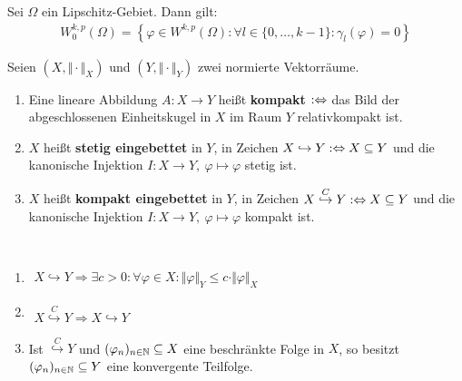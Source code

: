 \begin{satz}
	Sei $\Omega$ ein Lipschitz-Gebiet.
	Dann gilt:
	\begin{align*}
		W_0^{k,p}(\Omega)=\left\lbrace\varphi\in W^{k,p}(\Omega):
		\forall l\in\lbrace0,\ldots,k-1\rbrace:\gamma_l(\varphi)=0\right\rbrace
	\end{align*}
\end{satz}

\begin{definition}
	Seien $(X,\Vert\cdot\Vert_X)$ und $(Y,\Vert\cdot\Vert_Y)$ zwei normierte Vektorräume.
	\begin{enumerate}
		\item Eine lineare Abbildung $A:X\to Y$ heißt \textbf{kompakt} $:\Leftrightarrow$ das Bild der abgeschlossenen Einheitskugel in $X$ im Raum $Y$ relativkompakt ist.
		\item $X$ heißt \textbf{stetig eingebettet} in $Y$, in Zeichen $X\hookrightarrow Y:\Leftrightarrow X\subseteq Y$ und die kanonische Injektion $I:X\to Y,~\varphi\mapsto\varphi$ stetig ist.
		\item $X$ heißt \textbf{kompakt eingebettet} in $Y$, in Zeichen $X\stackrel{C}{\hookrightarrow} Y:\Leftrightarrow X\subseteq Y$ und die kanonische Injektion $I:X\to Y,~\varphi\mapsto\varphi$ kompakt ist.
	\end{enumerate}
\end{definition}

\begin{bemerkung}\
	\begin{enumerate}
		\item $\begin{aligned}
			X\hookrightarrow Y\Longrightarrow\exists c>0:\forall\varphi\in X:\Vert\varphi\Vert_Y\leq c\cdot\Vert\varphi\Vert_X
		\end{aligned}$
		\item $\begin{aligned}
			X\stackrel{C}{\hookrightarrow} Y\Longrightarrow X\hookrightarrow Y
		\end{aligned}$
		\item Ist $\stackrel{C}{\hookrightarrow} Y$ und $(\varphi_n)_{n\in\mathbb{N}}\subseteq X$ eine beschränkte Folge in $X$, so besitzt $(\varphi_n)_{n\in\mathbb{N}}\subseteq Y$ eine konvergente Teilfolge.
	\end{enumerate}
\end{bemerkung}

